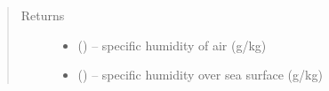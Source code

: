\documentclass[letterpaper,10pt,english]{sphinxmanual}
\begin{document}
\begin{fulllineitems}
\begin{quote}
\begin{description}
\item[{Returns}] \leavevmode
\begin{itemize}
\item {} 
 (\href{https://docs.python.org/3/library/functions.html\#float}{}) -- specific humidity of air (g/kg)

\item {} 
 (\href{https://docs.python.org/3/library/functions.html\#float}{}) -- specific humidity over sea surface (g/kg)

\end{itemize}

\end{description}\end{quote}

\end{fulllineitems}

\end{document}
